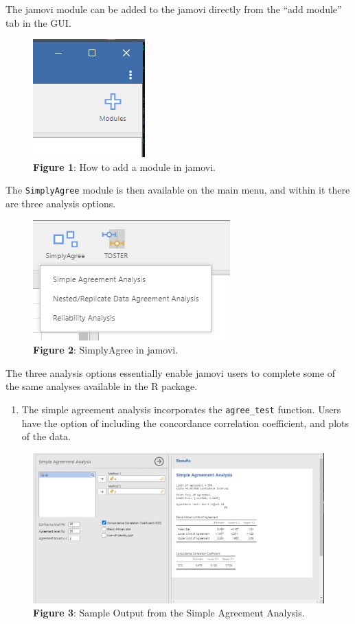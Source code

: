 \documentclass[
]{article}
\providecommand{\tightlist}{%
  \setlength{\itemsep}{0pt}\setlength{\parskip}{0pt}}
\begin{document}
The jamovi module can be added to the jamovi directly from the ``add
module'' tab in the GUI.

\begin{figure}
\centering
\includegraphics{module_button.PNG}
\caption{\textbf{Figure 1}: How to add a module in jamovi.}
\end{figure}

The \texttt{SimplyAgree} module is then available on the main menu, and
within it there are three analysis options.

\begin{figure}
\centering
\includegraphics{simplyagree_button.PNG}
\caption{\textbf{Figure 2}: SimplyAgree in jamovi.}
\end{figure}

The three analysis options essentially enable jamovi users to complete
some of the same analyses available in the R package.

\begin{enumerate}
\def\labelenumi{\arabic{enumi}.}
\tightlist
\item
  The simple agreement analysis incorporates the \texttt{agree\_test}
  function. Users have the option of including the concordance
  correlation coefficient, and plots of the data.
\end{enumerate}

\begin{figure}
\centering
\includegraphics{simple_agreement.PNG}
\caption{\textbf{Figure 3}: Sample Output from the Simple Agreement
Analysis.}
\end{figure}
\end{document}
